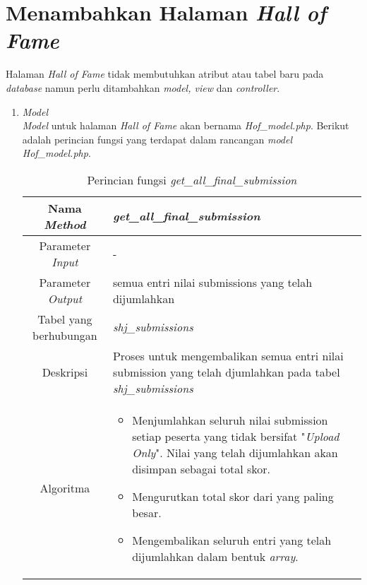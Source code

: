 \section{Menambahkan Halaman \textit{Hall of Fame}}
Halaman \textit{Hall of Fame} tidak membutuhkan atribut atau tabel baru pada \textit{database} namun perlu ditambahkan \textit{model, view} dan \textit{controller}.

\begin{enumerate}
	\item \textit{Model} \\
	\textit{Model} untuk halaman \textit{Hall of Fame} akan bernama \textit{Hof\_model.php}. Berikut adalah perincian fungsi yang terdapat dalam rancangan \textit{model Hof\_model.php}.
	\begin{table}[H]
		\caption{Perincian fungsi \textit{get\_all\_final\_submission}}
		\begin{tabular}{|c|p{11cm}|}
			\hline
			Nama \textit{Method} 	& 	\textit{get\_all\_final\_submission} 	\\
			\hline
			Parameter \textit{Input} & - \\
			\hline
			Parameter \textit{Output} & semua entri nilai submissions yang telah dijumlahkan \\
			\hline
			Tabel yang berhubungan & \textit{shj\_submissions} \\
			\hline
			Deskripsi	& Proses untuk mengembalikan semua entri nilai submission yang telah djumlahkan pada tabel \textit{shj\_submissions} \\
			\hline
			Algoritma	& \begin{itemize}
				\item Menjumlahkan seluruh nilai submission setiap peserta yang tidak bersifat "\textit{Upload Only}". Nilai yang telah dijumlahkan akan disimpan sebagai total skor.
				\item Mengurutkan total skor dari yang paling besar.
				\item Mengembalikan seluruh entri yang telah dijumlahkan dalam bentuk \textit{array}.
			\end{itemize} \\
			\hline
		\end{tabular}
	\end{table}
	

\end{enumerate}
